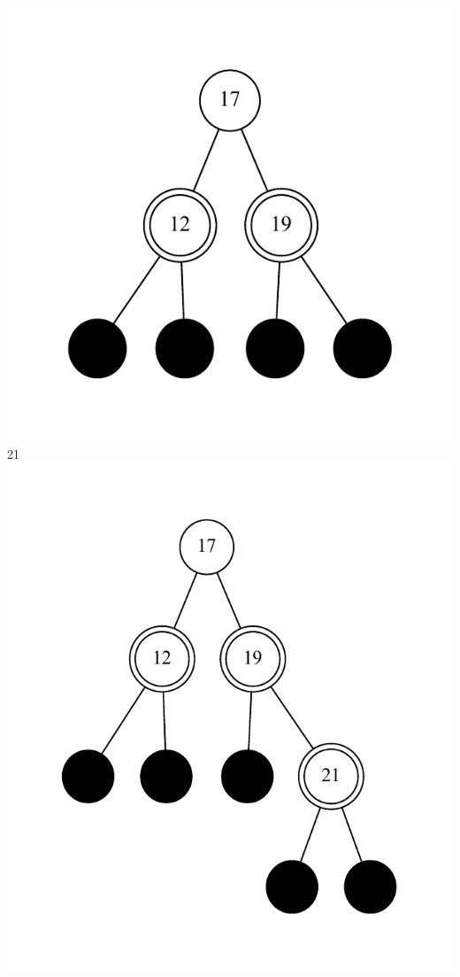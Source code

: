 \documentclass[11pt]{article}
\begin{document}
\includegraphics{step6.pdf}\\
	21\\
\includegraphics{step7.pdf}\\
\end{document}
